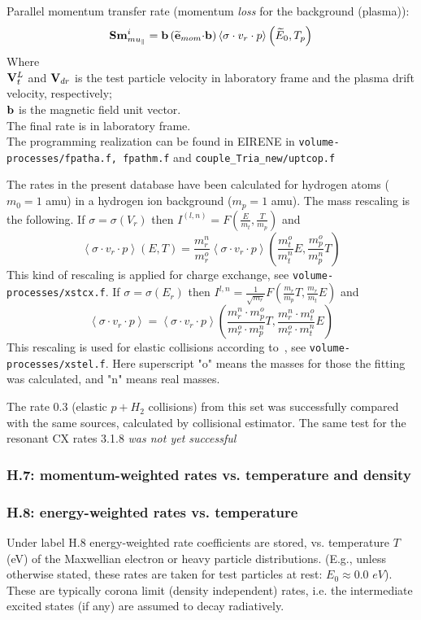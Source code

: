\documentclass[12pt,dvipdfmx]{article}
\begin{document}
Parallel momentum transfer rate (momentum {\em loss} for the background (plasma)):
$$
{\bf Sm}^i_{mu_\parallel}= {\bf b} \left(\widetilde{{\bf e}}_{mom}{\bf\cdot}{\bf b}\right) \left<\sigma\cdot v_r\cdot p\right>
\left(\widetilde{E}_0 ,T_p\right)
$$
Where\\
${\bf V}^L_t$ and ${\bf V}_{dr}$ is the test particle velocity in laboratory frame and the plasma drift velocity, respectively;\\

${\bf b}$ is the magnetic field unit vector.\\
The final rate is in laboratory frame.\\
The programming realization can be found in EIRENE in {\tt volume-processes/fpatha.f, fpathm.f} and {\tt couple\_Tria\_new/uptcop.f}

The rates in the present database have been calculated for hydrogen atoms ($m_0=1$ amu) in a hydrogen ion background ($m_p=1$ amu). The mass rescaling is the following.
If $\sigma=\sigma(V_r)$ then $I^{(l,n)}=F\left(\frac{E}{m_t},\frac{T}{m_p}\right)$ and
$$\left<\sigma\cdot v_r\cdot p\right>(E,T)=\frac{m^n_r}{m^o_r}
\left<\sigma\cdot v_r\cdot p\right>(\frac{m^o_t}{m^n_t}E,\frac{m^o_p}{m^n_p}T)$$
This kind of rescaling is applied for charge exchange, see {\tt volume-processes/xstcx.f}.
If $\sigma=\sigma(E_r)$ then $I^{l,n}=\frac{1}{\sqrt{m_r}}F\left(\frac{m_r}{m_p}T, \frac{m_r}{m_t}E\right)$ and
$$\left<\sigma\cdot v_r\cdot p\right>=\left<\sigma\cdot v_r\cdot p\right>\left(\frac{m^n_r\cdot m^o_p}{m^o_r\cdot m^n_p}T,\frac{m^n_r\cdot m^o_t}{m^o_r\cdot m^n_t}E\right)$$
This rescaling is used for elastic collisions according to~\cite{kn:OakRidge}, see {\tt volume-processes/xstel.f}. Here superscript "o" means the masses for those the fitting was calculated, and "n" means real masses.

The rate 0.3 (elastic $p+H_2$ collisions) from this set was successfully compared with the same sources, calculated by collisional estimator. The same test for
the resonant CX rates 3.1.8 \textcolor[rgb]{0.98,0.00,0.00}{ {\em was not yet successful}}

\subsubsection{H.7: momentum-weighted rates vs. temperature and density}\label{sec1.3.7}

\subsubsection{H.8: energy-weighted rates vs. temperature}\label{sec1.3.8}
Under label H.8 energy-weighted rate coefficients are stored, vs. temperature $T$ (eV) of the
Maxwellian electron or heavy particle distributions.
(E.g., unless otherwise stated, these rates are taken for test particles at rest: $E_0 \approx 0.0$ $eV$).
These are typically corona limit (density independent) rates, i.e. the intermediate excited states (if any)
are assumed to decay radiatively.
\end{document}

